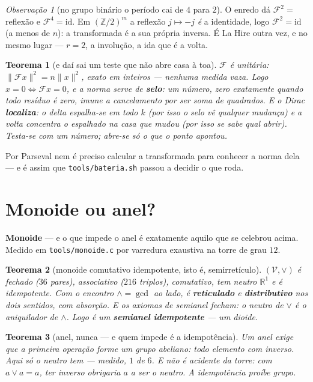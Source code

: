 \documentclass[11pt]{article}
\newcommand{\code}[1]{\texttt{\small #1}}
\newcommand{\Z}{\mathbb Z}
\newcommand{\R}{\mathbb R}
\newcommand{\F}{\mathcal F}
\theoremstyle{plain}
\newtheorem{teorema}{Teorema}
\theoremstyle{remark}
\newtheorem{obs}{Observação}
\begin{document}
\begin{obs}[no grupo binário o período cai de $4$ para $2$]
O enredo dá $\F^2=$ reflexão e $\F^4=\mathrm{id}$. Em $(\Z/2)^m$ a reflexão $j\mapsto-j$ \emph{é} a
identidade, logo $\F^2=\mathrm{id}$ (a menos de $n$): a transformada é a sua própria inversa. É La
Hire outra vez, e no mesmo lugar --- $r=2$, a involução, a ida que é a volta.
\end{obs}

\begin{teorema}[e daí sai um teste que não abre casa à toa]
$\F$ é unitária: $\|\F x\|^2=n\|x\|^2$, exato em inteiros --- nenhuma medida vaza. Logo
$x=0\iff\F x=0$, e a norma serve de \textbf{selo}: um número, zero exatamente quando todo resíduo é
zero, imune a cancelamento por ser soma de quadrados. E o Dirac \textbf{localiza}: o delta espalha-se
em todo $k$ (por isso o selo vê qualquer mudança) e a volta concentra o espalhado na casa que mudou
(por isso se sabe qual abrir). \emph{Testa-se com um número; abre-se só o que o ponto apontou.}
\end{teorema}

\noindent Por Parseval nem é preciso calcular a transformada para conhecer a norma dela --- e é assim
que \code{tools/bateria.sh} passou a decidir o que roda.

\section{Monoide ou anel?}

\textbf{Monoide} --- e o que impede o anel é exatamente aquilo que se celebrou acima. Medido em
\code{tools/monoide.c} por varredura exaustiva na torre de grau $12$.

\begin{teorema}[monoide comutativo idempotente, isto é, semirretículo]
$(\mathcal V,\vee)$ é fechado ($36$ pares), associativo ($216$ triplos), comutativo, tem neutro
$\R^1$ e é idempotente. Com o encontro $\wedge=\gcd$ ao lado, é \textbf{reticulado} e
\textbf{distributivo} nos dois sentidos, com absorção. E os axiomas de semianel fecham: o neutro de
$\vee$ é o \emph{aniquilador} de $\wedge$. Logo é um \textbf{semianel idempotente} --- um dioide.
\end{teorema}

\begin{teorema}[anel, nunca --- e quem impede é a idempotência]
Um anel exige que a primeira operação forme um \emph{grupo} abeliano: todo elemento com inverso. Aqui
só o neutro tem --- medido, $1$ de $6$. E não é acidente da torre: com $a\vee a=a$, ter inverso
obrigaria $a$ a ser o neutro. \emph{A idempotência proíbe grupo.}
\end{teorema}
\end{document}
